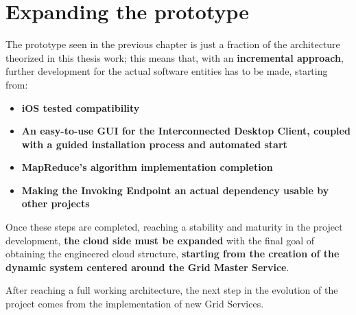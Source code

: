 \section{Expanding the prototype}
The prototype seen in the previous chapter is just a fraction of the architecture theorized in this thesis work; this means that, with an \textbf{incremental approach}, further development for the actual software entities has to be made, starting from:
\begin{itemize}
    \item \textbf{iOS tested compatibility}
    \item \textbf{An easy-to-use GUI for the Interconnected Desktop Client, coupled with a guided installation process and automated start}
    \item \textbf{MapReduce's algorithm implementation completion}
    \item \textbf{Making the Invoking Endpoint an actual dependency usable by other projects}
\end{itemize}

Once these steps are completed, reaching a stability and maturity in the project development, \textbf{the cloud side must be expanded} with the final goal of obtaining the engineered cloud structure, \textbf{starting from the creation of the dynamic system centered around the Grid Master Service}.

After reaching a full working architecture, the next step in the evolution of the project comes from the implementation of new Grid Services.